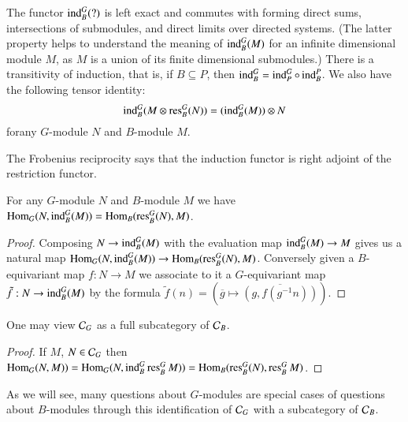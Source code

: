\begin{remark}\label{chap2-rem2.1.5}
The functor $\operatorname{ind}^{G}_{B}(?)$ is left exact and commutes with forming
direct sums, intersections of submodules, and direct
limits over 
directed systems. (The latter property helps to understand the meaning
of $\operatorname{ind}^{G}_{B}(M)$ for an infinite dimensional module $M$, as $M$ is
a union of its finite dimensional submodules.) There is a 
transitivity of induction, 
that is, if $B\subseteq P$, then
$\operatorname{ind}^{G}_{B}=\operatorname{ind}^{G}_{P}\circ \operatorname{ind}^{P}_{B}$. We also have the
following tensor identity:
$$
\operatorname{ind}^{G}_{B}(M\otimes \operatorname{res}^{G}_{B}(N))=(\operatorname{ind}^{G}_{B}(M))\otimes N
$$
for\pageoriginale any $G$-module $N$ and $B$-module $M$.
\end{remark}

\label{page12}
The Frobenius reciprocity says that the
induction functor is right 
adjoint of the restriction functor.

\begin{proposition}\label{chap2-prop2.1.6}
For any $G$-module $N$ and $B$-module $M$ we have
$\operatorname{Hom}_{G}(N,\operatorname{ind}^{G}_{B}(M))=\operatorname{Hom}_{B}(\operatorname{res}^{G}_{B}(N),M)$. 
\end{proposition}

\begin{proof}
Composing $N\to \operatorname{ind}^{G}_{B}(M)$ with the evaluation map
$\operatorname{ind}^{G}_{B}(M)\to M$ gives us a natural map
$\operatorname{Hom}_{G}(N,\operatorname{ind}^{G}_{B}(M))\to
\operatorname{Hom}_{B}(\operatorname{res}^{G}_{B}(N),M)$. Conversely given a $B$-equivariant map
$f:N\to M$ we associate to it a $G$-equivariant map $\tilde{f}:N\to
\operatorname{ind}^{G}_{B}(M)$ by the formula $\tilde{f}(n)=(\overline{g}\mapsto
\overline{(g,f(g^{-1}n))})$. 
\end{proof}

\begin{corollary}\label{chap2-coro2.1.7}
One may view $\mathcal{C}_{G}$ as a full subcategory of $\mathcal{C}_{B}$.
\end{corollary}

\begin{proof}
If $M$, $N\in \mathcal{C}_{G}$ then
$\operatorname{Hom}_{G}(N,M))=\operatorname{Hom}_{G}(N,\operatorname{ind}^{G}_{B}\operatorname{res}^{G}_{B}M))=\operatorname{Hom}_{B}(\operatorname{res}^{G}_{B}(N),\operatorname{res}^{G}_{B}M)$. 
\end{proof}

\begin{remark}\label{chap2-rem2.1.8}
As we will see, many questions about $G$-modules are special cases of
questions about $B$-modules through this identification of $\mathcal{C}_{G}$
with a subcategory of $\mathcal{C}_{B}$.
\end{remark}

